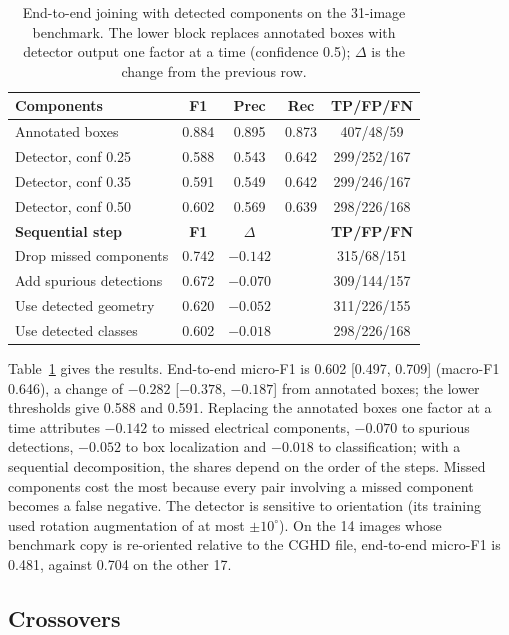 \documentclass{ieeeaccess}
\begin{document}
\begin{table}[t]
\caption{End-to-end joining with detected components on the 31-image benchmark. The lower block replaces annotated boxes with detector output one factor at a time (confidence 0.5); {$\Delta$} is the change from the previous row.}
\label{tab:e2e}
\centering
\footnotesize
\setlength{\tabcolsep}{4pt}
\begin{tabular}{lcccc}
\toprule
\textbf{Components} & \textbf{F1} & \textbf{Prec} & \textbf{Rec} & \textbf{TP/FP/FN} \\
\midrule
Annotated boxes & 0.884 & 0.895 & 0.873 & 407/48/59 \\
Detector, conf 0.25 & 0.588 & 0.543 & 0.642 & 299/252/167 \\
Detector, conf 0.35 & 0.591 & 0.549 & 0.642 & 299/246/167 \\
Detector, conf 0.50 & 0.602 & 0.569 & 0.639 & 298/226/168 \\
\midrule
\textbf{Sequential step} & \textbf{F1} & \textbf{$\Delta$} & & \textbf{TP/FP/FN} \\
\midrule
Drop missed components & 0.742 & $-0.142$ & & 315/68/151 \\
Add spurious detections & 0.672 & $-0.070$ & & 309/144/157 \\
Use detected geometry & 0.620 & $-0.052$ & & 311/226/155 \\
Use detected classes & 0.602 & $-0.018$ & & 298/226/168 \\
\bottomrule
\end{tabular}
\end{table}

Table~\ref{tab:e2e} gives the results. End-to-end micro-F1 is 0.602 [0.497, 0.709] (macro-F1 0.646), a change of $-0.282$ [$-0.378$, $-0.187$] from annotated boxes; the lower thresholds give 0.588 and 0.591. Replacing the annotated boxes one factor at a time attributes $-0.142$ to missed electrical components, $-0.070$ to spurious detections, $-0.052$ to box localization and $-0.018$ to classification; with a sequential decomposition, the shares depend on the order of the steps. Missed components cost the most because every pair involving a missed component becomes a false negative. The detector is sensitive to orientation (its training used rotation augmentation of at most $\pm10^{\circ}$). On the 14 images whose benchmark copy is re-oriented relative to the CGHD file, end-to-end micro-F1 is 0.481, against 0.704 on the other 17.

\subsection{Crossovers}
\label{sec:crossovers}
\end{document}
